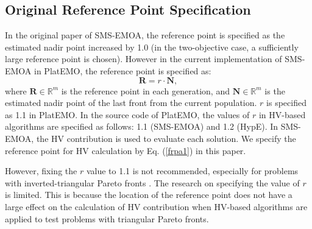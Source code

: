 \documentclass[conference]{IEEEtran}
\begin{document}
\subsection{Original Reference Point Specification}
In the original paper of SMS-EMOA\cite{smsemoa}, 
the reference point is specified as the estimated nadir point increased by 1.0
(in the two-objective case, a sufficiently large reference point is chosen). 
However in the current implementation of SMS-EMOA in PlatEMO\cite{PlatEMO}, the reference point is specified as:
\begin{equation}\label{frpa1}
  \boldsymbol R = r \cdot \boldsymbol N,  
\end{equation}
where $\boldsymbol R \in \mathbb{R}^m$ is the reference point in each generation, 
and $\boldsymbol N \in \mathbb{R}^m$ is the estimated nadir point of the last front from the current population. 
$r$ is specified as 1.1 in PlatEMO. 
In the source code of PlatEMO, the values of $r$ in HV-based algorithms are specified as follows: 
1.1 (SMS-EMOA\cite{smsemoa}) and 1.2 (HypE\cite{HypE}). %
In SMS-EMOA,  
the HV contribution is used to evaluate each solution. 
We specify the reference point for HV calculation by  Eq. (\ref{frpa1}) in this paper.

However, fixing the $r$ value to 1.1 is not recommended, especially for problems with inverted-triangular Pareto fronts
\cite{hisao:RPhowtoSpecify}. 
The research on specifying the value of $r$ is limited.
This is because the location of the reference point does not have a large effect on the calculation of HV contribution 
when HV-based algorithms are applied to test problems with triangular Pareto fronts. 

%
\end{document}

